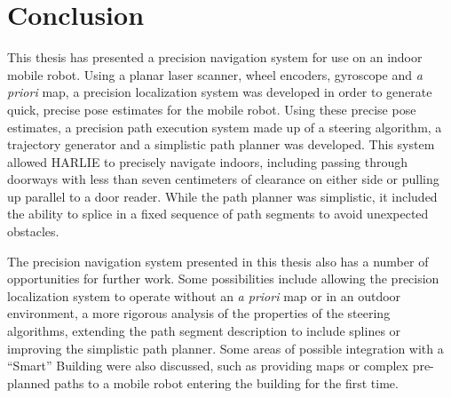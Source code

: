 \section{Conclusion}

This thesis has presented a precision navigation system for use on an indoor mobile robot. Using a planar laser scanner, wheel encoders, gyroscope and \emph{a priori} map, a precision localization system was developed in order to generate quick, precise pose estimates for the mobile robot. Using these precise pose estimates, a precision path execution system made up of a steering algorithm, a trajectory generator and a simplistic path planner was developed. This system allowed HARLIE to precisely navigate indoors, including passing through doorways with less than seven centimeters of clearance on either side or pulling up parallel to a door reader. While the path planner was simplistic, it included the ability to splice in a fixed sequence of path segments to avoid unexpected obstacles.

The precision navigation system presented in this thesis also has a number of opportunities for further work. Some possibilities include allowing the precision localization system to operate without an \emph{a priori} map or in an outdoor environment, a more rigorous analysis of the properties of the steering algorithms, extending the path segment description to include splines or improving the simplistic path planner. Some areas of possible integration with a ``Smart'' Building were also discussed, such as providing maps or complex pre-planned paths to a mobile robot entering the building for the first time.